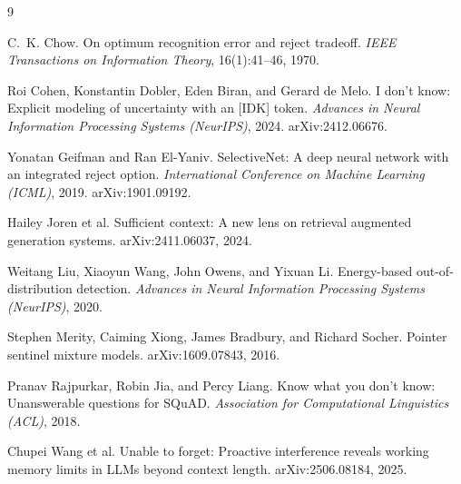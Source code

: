 \documentclass[11pt,a4paper]{article}
\begin{document}
\begin{thebibliography}{9}

C.~K. Chow.
\newblock On optimum recognition error and reject tradeoff.
\newblock \emph{IEEE Transactions on Information Theory}, 16(1):41--46, 1970.

Roi Cohen, Konstantin Dobler, Eden Biran, and Gerard de Melo.
\newblock I don't know: Explicit modeling of uncertainty with an [IDK] token.
\newblock \emph{Advances in Neural Information Processing Systems (NeurIPS)}, 2024.
\newblock arXiv:2412.06676.

Yonatan Geifman and Ran El-Yaniv.
\newblock SelectiveNet: A deep neural network with an integrated reject option.
\newblock \emph{International Conference on Machine Learning (ICML)}, 2019.
\newblock arXiv:1901.09192.

Hailey Joren et al.
\newblock Sufficient context: A new lens on retrieval augmented generation systems.
\newblock arXiv:2411.06037, 2024.

Weitang Liu, Xiaoyun Wang, John Owens, and Yixuan Li.
\newblock Energy-based out-of-distribution detection.
\newblock \emph{Advances in Neural Information Processing Systems (NeurIPS)}, 2020.

Stephen Merity, Caiming Xiong, James Bradbury, and Richard Socher.
\newblock Pointer sentinel mixture models.
\newblock arXiv:1609.07843, 2016.

Pranav Rajpurkar, Robin Jia, and Percy Liang.
\newblock Know what you don't know: Unanswerable questions for SQuAD.
\newblock \emph{Association for Computational Linguistics (ACL)}, 2018.

Chupei Wang et al.
\newblock Unable to forget: Proactive interference reveals working memory limits in LLMs beyond
context length.
\newblock arXiv:2506.08184, 2025.

\end{thebibliography}
\end{document}

